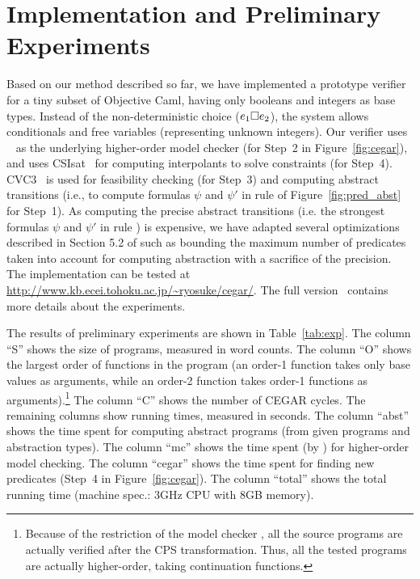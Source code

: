 \section{Implementation and Preliminary Experiments}
\label{sec:experiment}

Based on our method described so far, we have implemented a prototype 
verifier for a tiny subset of Objective Caml, having only booleans and 
integers as base types. Instead of the non-deterministic choice 
(\(e_1\square e_2\)), the system allows conditionals and free variables 
(representing unknown integers). Our verifier uses 
\trecs{}~\cite{Kobayashi2009,Kobayashi2009d} as the underlying 
higher-order model checker (for Step~2 in Figure~\ref{fig:cegar}), and 
uses CSIsat~\cite{Beyer2008} for computing interpolants to solve 
constraints (for Step~4).
CVC3~\cite{Barrett2007} is used for feasibility checking (for Step~3) 
and computing abstract transitions (i.e., to compute formulas \(\psi\) 
and \(\psi'\) in rule  of Figure~\ref{fig:pred_abst} for 
Step~1). As computing the precise abstract transitions (i.e. the 
strongest formulas \(\psi\) and \(\psi'\) in rule ) is 
expensive, we have adapted several optimizations described in Section 
5.2 of \cite{Ball2001} such as bounding the maximum number of predicates 
taken into account for computing abstraction with a sacrifice of the 
precision. The implementation can be tested at 
\url{http://www.kb.ecei.tohoku.ac.jp/~ryosuke/cegar/}. 
\iffull
\else
The full version~\cite{Kobayashi2011} contains more details about the experiments.
\fi

The results of preliminary experiments are shown in Table~\ref{tab:exp}. 
The column ``S'' shows the size of programs, measured in word counts.
%
The column ``O'' shows the largest order of functions in the 
program (an order-1 function  takes only base values as arguments, while 
an order-2 function takes  order-1 functions as 
arguments).\footnote{Because of the restriction of the model checker 
\trecs{}, all the source programs are actually verified after the CPS 
transformation. Thus, all the tested programs are actually higher-order, 
taking continuation functions.} The column ``C''
shows the number of CEGAR cycles.
The remaining columns show running times, measured in seconds. The 
column ``abst'' shows the time spent for computing abstract programs 
(from given programs and abstraction types). The column ``mc'' shows the 
time spent (by \trecs{}) for higher-order model checking. The column 
``cegar'' shows the time spent for finding new predicates (Step~4 in 
Figure~\ref{fig:cegar}).
The column ``total'' shows the total running time (machine spec.: 3GHz 
CPU with 8GB memory).

